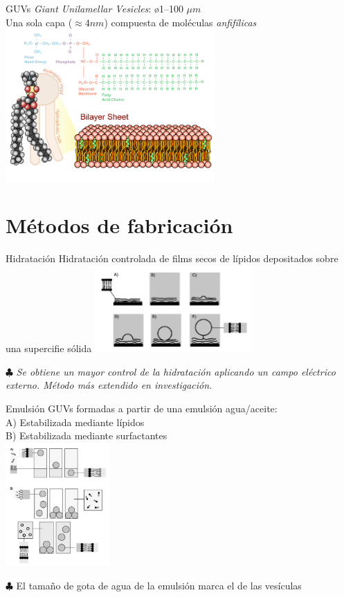 \documentclass[spanish]{beamer}
\begin{document}
\begin{frame}{GUVs}
  \emph{Giant Unilamellar Vesicles}: \o 1--100 $\mu m$\\
  Una sola capa ($\approx 4 nm$) compuesta de moléculas \emph{anfifílicas}
  \vfill
  \centering
  \includegraphics[width=0.6\textwidth]{img/bilayer}
\end{frame}

\section{Métodos de fabricación}

\begin{frame}{Hidratación}
  Hidratación controlada de films secos de lípidos depositados sobre una supercifie sólida
  \vfill
  \centering
  \includegraphics[width=6cm]{img/m_hydration}
  \vfill \small \raggedright 
  $\clubsuit$ \emph{Se obtiene un mayor control de la hidratación aplicando un campo eléctrico externo. Método más extendido en investigación.}
\end{frame}

\begin{frame}{Emulsión}
  GUVs formadas a partir de una emulsión agua/aceite:\\
    \hspace{1cm} A)  Estabilizada mediante lípidos\\
    \hspace{1cm} B)  Estabilizada mediante surfactantes\\
  \vfill
  \centering
  \includegraphics[width=4cm]{img/m_emulsion}
  \vfill \small \slshape \raggedright $\clubsuit$
  El tamaño de gota de agua de la emulsión marca el de las vesículas
\end{frame}
\end{document}
